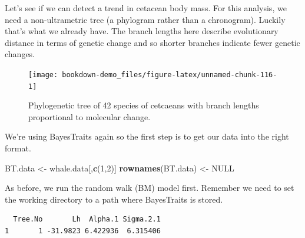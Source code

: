 \documentclass[
]{book}
\newenvironment{Shaded}{\begin{snugshade}}{\end{snugshade}}
\newcommand{\DecValTok}[1]{\textcolor[rgb]{0.00,0.00,0.81}{#1}}
\newcommand{\KeywordTok}[1]{\textcolor[rgb]{0.13,0.29,0.53}{\textbf{#1}}}
\newcommand{\NormalTok}[1]{#1}
\newcommand{\OperatorTok}[1]{\textcolor[rgb]{0.81,0.36,0.00}{\textbf{#1}}}
\newcommand{\OtherTok}[1]{\textcolor[rgb]{0.56,0.35,0.01}{#1}}
\newcommand{\StringTok}[1]{\textcolor[rgb]{0.31,0.60,0.02}{#1}}
\begin{document}
Let's see if we can detect a trend in cetacean body mass. For this analysis, we need a non-ultrametric tree (a phylogram rather than a chronogram). Luckily that's what we already have. The branch lengths here describe evolutionary distance in terms of genetic change and so shorter branches indicate fewer genetic changes.

\begin{figure}[H]

{\centering \texttt{[image: bookdown-demo\_files/figure-latex/unnamed-chunk-116-1]} 

}

\caption{Phylogenetic tree of 42 species of cetcaeans with branch lengths proportional to molecular change.}\label{fig:unnamed-chunk-116}
\end{figure}

We're using BayesTraits again so the first step is to get our data into the right format.

\begin{Shaded}
\begin{Highlighting}[]
\NormalTok{BT.data \textless{}{-}}\StringTok{ }\NormalTok{whale.data[,}\KeywordTok{c}\NormalTok{(}\DecValTok{1}\NormalTok{,}\DecValTok{2}\NormalTok{)]}
\KeywordTok{rownames}\NormalTok{(BT.data) \textless{}{-}}\StringTok{ }\OtherTok{NULL}
\end{Highlighting}
\end{Shaded}

As before, we run the random walk (BM) model first. Remember we need to set the working directory to a path where BayesTraits is stored.

\begin{Shaded}
\end{Shaded}

\begin{verbatim}
  Tree.No       Lh  Alpha.1 Sigma.2.1
1       1 -31.9823 6.422936  6.315406
\end{verbatim}
\end{document}
